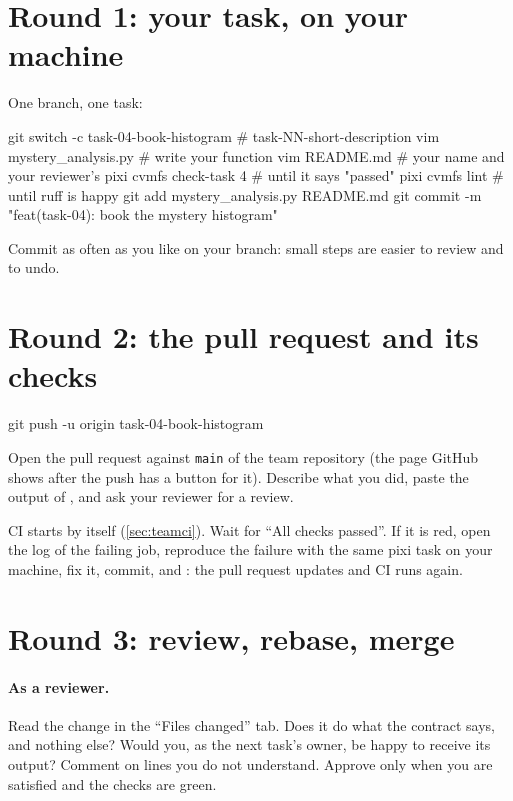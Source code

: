 \section{Round 1: your task, on your machine}

One branch, one task:
\begin{shell}
git switch -c task-04-book-histogram        # task-NN-short-description
vim mystery_analysis.py                     # write your function
vim README.md                               # your name and your reviewer's
pixi cvmfs check-task 4                     # until it says "passed"
pixi cvmfs lint                             # until ruff is happy
git add mystery_analysis.py README.md
git commit -m "feat(task-04): book the mystery histogram"
\end{shell}
Commit as often as you like on your branch: small steps are easier to review
and to undo.

\section{Round 2: the pull request and its checks}

\begin{shell}
git push -u origin task-04-book-histogram
\end{shell}
Open the pull request against \texttt{main} of the team repository (the page
GitHub shows after the push has a button for it). Describe what you did,
paste the output of , and ask your reviewer for a
review.

CI starts by itself (\cref{sec:teamci}). Wait for ``All checks passed''. If it
is red, open the log of the failing job, reproduce the failure with the same
pixi task on your machine, fix it, commit, and : the pull
request updates and CI runs again.

\section{Round 3: review, rebase, merge}

\paragraph{As a reviewer.} Read the change in the ``Files changed'' tab. Does
it do what the contract says, and nothing else? Would you, as the next task's
owner, be happy to receive its output? Comment on lines you do not
understand. Approve only when you are satisfied and the checks are green.

